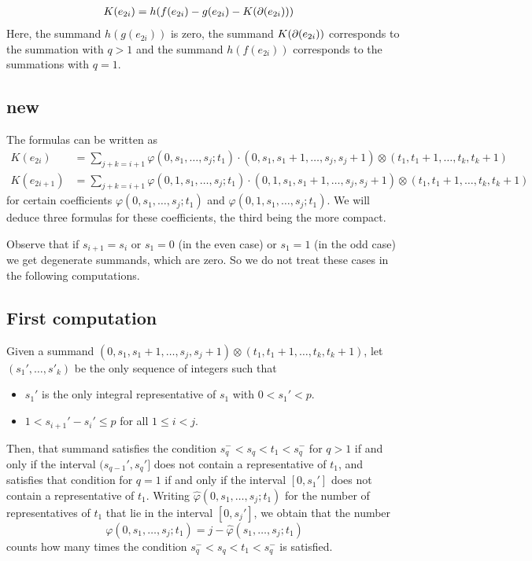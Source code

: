 \begin{align*}
	K(e_{2i}) &= h(f(e_{2i})-g(e_{2i})-K(\operatorname{\partial}(e_{2i})))
\end{align*}
Here, the summand $h(g(e_{2i}))$ is zero, the summand $K(\operatorname{\partial}(e_{2i}))$ corresponds to the summation with $q>1$ and the summand $h(f(e_{2i}))$ corresponds to the summations with $q=1$.

\subsection{new}

	The formulas can be written as
\begin{align*}
	K(e_{2i}) &= \sum_{j+k = i+1} \varphi(0,s_1,\ldots,s_j;t_1)\cdot (0,s_1,s_1+1,\ldots,s_j,s_j+1)\otimes(t_1,t_1+1,\ldots,t_k,t_k+1) \\
	K(e_{2i+1}) &= \sum_{j+k = i+1} \varphi(0,1,s_1,\ldots,s_j;t_1)\cdot (0,1,s_1,s_1+1,\ldots,s_j,s_j+1)\otimes(t_1,t_1+1,\ldots,t_k,t_k+1)
\end{align*}
for certain coefficients $\varphi(0,s_1,\ldots,s_j;t_1)$ and $\varphi(0,1,s_1,\ldots,s_j;t_1)$. We will deduce three formulas for these coefficients, the third being the more compact.

Observe that if $s_{i+1} = s_i$ or $s_1 = 0$ (in the even case) or $s_1=1$ (in the odd case) we get degenerate summands, which are zero. So we do not treat these cases in the following computations.

\subsection*{First computation} Given a summand $(0,s_1,s_1+1,\ldots,s_j,s_j+1)\otimes (t_1,t_1+1,\ldots,t_k,t_k+1)$, let $(s_1',\ldots,s'_k)$ be the only sequence of integers such that
\begin{itemize}
	\item $s_1'$ is the only integral representative of $s_1$ with $0< s_1'< p$.
	\item $1<s_{i+1}'-s_i'\leq p$ for all $1\leq i<j$.
\end{itemize}
Then, that summand satisfies the condition $s_q^-<s_q<t_1<s_q^-$ for $q>1$ if and only if the interval $(s_{q-1}',s_q']$ does not contain a representative of $t_1$, and satisfies that condition for $q=1$ if and only if the interval $[0,s_1']$ does not contain a representative of $t_1$. Writing $\hat{\varphi}(0,s_1,\ldots,s_j;t_1)$ for the number of representatives of $t_1$ that lie in the interval $[0,s_j']$, we obtain that the number
\[\varphi(0,s_1,\ldots,s_j;t_1) = j-\hat{\varphi}(s_1,\ldots,s_j;t_1)\]
counts how many times the condition $s_q^-<s_q<t_1<s_q^-$ is satisfied.

